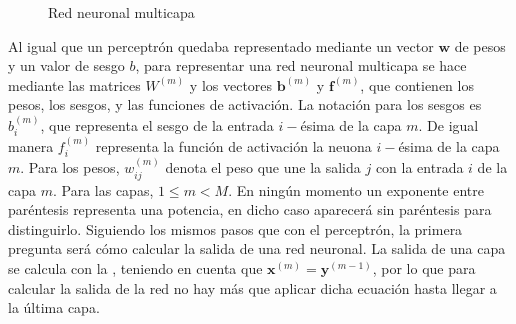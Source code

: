 \begin{figure}[!h]
{
			}
			\caption{Red neuronal multicapa}
			\label{fig:rna_completa}
		\end{figure}
		
		Al igual que un perceptrón quedaba representado mediante un vector $\textbf{w}$ de pesos y un valor de sesgo $b$, para representar una red neuronal multicapa se hace mediante las matrices $W^{(m)}$ y los vectores $\textbf{b}^{(m)}$ y $\textbf{f}^{(m)}$, que contienen los pesos, los sesgos, y las funciones de activación. La notación para los sesgos es $b_i^{(m)}$, que representa el sesgo de la entrada $i-$ésima de la capa $m$. De igual manera $f_i^{(m)}$ representa la función de activación la neuona $i-$ésima de la capa $m$. Para los pesos, $w_{ij}^{(m)}$ denota el peso que une la salida $j$ con la entrada $i$ de la capa $m$. Para las capas, $1 \leq m < M$. En ningún momento un exponente entre paréntesis representa una potencia, en dicho caso aparecerá sin paréntesis para distinguirlo. Siguiendo los mismos pasos que con el perceptrón, la primera pregunta será cómo calcular la salida de una red neuronal. La salida de una capa se calcula con la , teniendo en cuenta que $\textbf{x}^{(m)} = \textbf{y}^{(m-1)}$, por lo que para calcular la salida de la red no hay más que aplicar dicha ecuación hasta llegar a la última capa. 
		
